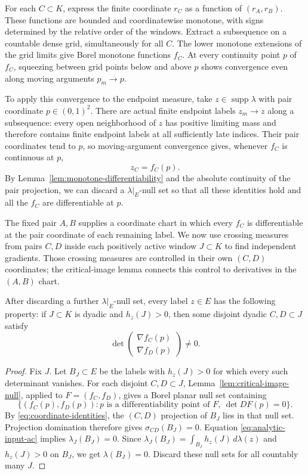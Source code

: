 For each $C\subset K$, express the finite coordinate $r_C$ as a function
of $(r_A,r_B)$.  These functions are bounded and coordinatewise monotone,
with signs determined by the relative order of the windows.  Extract a
subsequence on a countable dense grid, simultaneously for all $C$.
The lower monotone extensions of the grid limits give Borel monotone
functions $f_C$.  At every continuity point $p$ of $f_C$, squeezing
between grid points below and above $p$ shows convergence even along
moving arguments $p_m\to p$.

To apply this convergence to the endpoint measure, take
$z\in\operatorname{supp}\lambda$ with pair coordinate $p\in(0,1)^2$.
There are actual finite endpoint labels $z_m\to z$ along a subsequence:
every open neighborhood of $z$ has positive limiting mass and therefore
contains finite endpoint labels at all sufficiently late indices.
Their pair coordinates tend to $p$, so moving-argument convergence gives,
whenever $f_C$ is continuous at $p$,
\begin{equation}
 z_C=f_C(p).
 \label{eq:coordinate-identities}
\end{equation}
By Lemma~\ref{lem:monotone-differentiability} and the absolute continuity
of the pair projection, we can discard a $\lambda|_E$-null set so that
all these identities hold and all the $f_C$ are differentiable at $p$.

The fixed pair $A,B$ supplies a coordinate chart in which every $f_C$
is differentiable at the pair coordinate of each remaining label.
We now use crossing
measures from pairs $C,D$ inside each positively active window
$J\subset K$ to find independent gradients.  Those crossing measures
are controlled in their own $(C,D)$ coordinates; the critical-image
lemma connects this control to derivatives in the $(A,B)$ chart.

\begin{lemma}\label{lem:independent-gradients}
After discarding a further $\lambda|_E$-null set, every label $z\in E$
has the following property: if $J\subset K$ is dyadic and $h_z(J)>0$,
then some disjoint dyadic $C,D\subset J$ satisfy
\[
 \det\begin{pmatrix}\nabla f_C(p)\\ \nabla f_D(p)\end{pmatrix}\ne0.
\]
\end{lemma}

\begin{proof}
Fix $J$.  Let $B_J\subset E$ be the labels with $h_z(J)>0$ for which
every such determinant vanishes.  For each disjoint $C,D\subset J$,
Lemma~\ref{lem:critical-image-null}, applied to $F=(f_C,f_D)$, gives a
Borel planar null set containing
\[
 \{(f_C(p),f_D(p)):p\text{ is a differentiability point of }F,
                  \ \det DF(p)=0\}.
\]
By \eqref{eq:coordinate-identities}, the $(C,D)$ projection of $B_J$
lies in that null set.  Projection domination therefore gives
$\sigma_{CD}(B_J)=0$.  Equation \eqref{eq:analytic-input-ac} implies
$\lambda_J(B_J)=0$.  Since
$\lambda_J(B_J)=\int_{B_J}h_z(J)\,d\lambda(z)$ and $h_z(J)>0$ on
$B_J$, we get $\lambda(B_J)=0$.  Discard these null sets for all
countably many $J$.
\end{proof}

